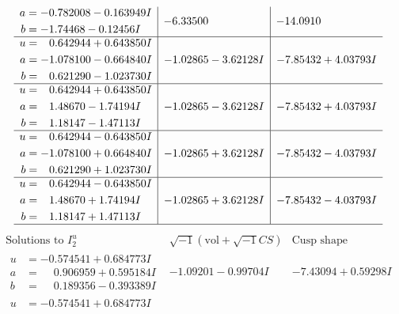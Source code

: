 \documentclass[1p]{elsarticle_modified}
\theoremstyle{definition}
\newcommand{\I}{\sqrt{-1}}
\begin{document}
$$\begin{array}{c|c|c}
\begin{aligned}
a &= -0.782008 - 0.163949 I \\
b &= -1.74468 - 0.12456 I\end{aligned}
 & -6.33500\phantom{ +0.000000I} & -14.0910\phantom{ +0.000000I} \\ \hline\begin{aligned}
u &= \phantom{-}0.642944 + 0.643850 I \\
a &= -1.078100 - 0.664840 I \\
b &= \phantom{-}0.621290 - 1.023730 I\end{aligned}
 & -1.02865 - 3.62128 I & -7.85432 + 4.03793 I \\ \hline\begin{aligned}
u &= \phantom{-}0.642944 + 0.643850 I \\
a &= \phantom{-}1.48670 - 1.74194 I \\
b &= \phantom{-}1.18147 - 1.47113 I\end{aligned}
 & -1.02865 - 3.62128 I & -7.85432 + 4.03793 I \\ \hline\begin{aligned}
u &= \phantom{-}0.642944 - 0.643850 I \\
a &= -1.078100 + 0.664840 I \\
b &= \phantom{-}0.621290 + 1.023730 I\end{aligned}
 & -1.02865 + 3.62128 I & -7.85432 - 4.03793 I \\ \hline\begin{aligned}
u &= \phantom{-}0.642944 - 0.643850 I \\
a &= \phantom{-}1.48670 + 1.74194 I \\
b &= \phantom{-}1.18147 + 1.47113 I\end{aligned}
 & -1.02865 + 3.62128 I & -7.85432 - 4.03793 I\\
 \hline 
 \end{array}$$\newpage$$\begin{array}{c|c|c}  
\text{Solutions to }I^u_{2}& \I (\text{vol} + \sqrt{-1}CS) & \text{Cusp shape}\\
 \hline 
\begin{aligned}
u &= -0.574541 + 0.684773 I \\
a &= \phantom{-}0.906959 + 0.595184 I \\
b &= \phantom{-}0.189356 - 0.393389 I\end{aligned}
 & -1.09201 - 0.99704 I & -7.43094 + 0.59298 I \\ \hline\begin{aligned}
u &= -0.574541 + 0.684773 I \\

\end{aligned}
\end{array}$$
\end{document}

